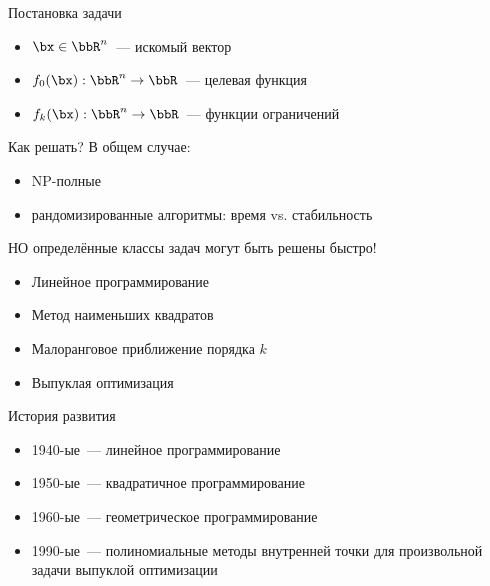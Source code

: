 \documentclass[12pt]{beamer}
\begin{document}
\begin{frame}{Постановка задачи}
\begin{itemize}[<+->]
\item $\bx \in \bbR^n$~--- искомый вектор
\item $f_0(\bx): \bbR^n \rightarrow \bbR$~--- целевая функция
\item $f_k(\bx): \bbR^n \rightarrow \bbR$~--- функции ограничений
\end{itemize}
\end{frame}

\begin{frame}{Как решать?}
В общем случае:
\begin{itemize}
\item NP-полные
\item {\small рандомизированные алгоритмы: время vs. стабильность}
\end{itemize}

{\small НО определённые классы задач могут быть решены быстро!}

\begin{itemize}
\item Линейное программирование
\item Метод наименьших квадратов
\item Малоранговое приближение порядка $k$
\item Выпуклая оптимизация
\end{itemize}
\end{frame}

\begin{frame}{История развития}

\begin{itemize}
\item 1940-ые~--- линейное программирование
\item 1950-ые~--- квадратичное программирование
\item 1960-ые~--- геометрическое программирование
\item 1990-ые~--- полиномиальные методы внутренней точки для произвольной задачи выпуклой оптимизации
\end{itemize}
\end{frame}
\end{document}

